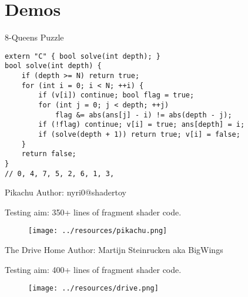 \section{Demos}

\begin{frame}[fragile]{8-Queens Puzzle}
\begin{lstlisting}
extern "C" { bool solve(int depth); }
bool solve(int depth) {
	if (depth >= N) return true;
	for (int i = 0; i < N; ++i) {
		if (v[i]) continue; bool flag = true;
		for (int j = 0; j < depth; ++j) 
            flag &= abs(ans[j] - i) != abs(depth - j); 
        if (!flag) continue; v[i] = true; ans[depth] = i;
		if (solve(depth + 1)) return true; v[i] = false;
	}
	return false;
}
// 0, 4, 7, 5, 2, 6, 1, 3,
\end{lstlisting}
\end{frame}

\begin{frame}[fragile]{Pikachu}
    Author: nyri0@shadertoy

    Testing aim: 350+ lines of fragment shader code.
    \begin{figure}
        \texttt{[image: ../resources/pikachu.png]}
    \end{figure}
\end{frame}

\begin{frame}[fragile]{The Drive Home}
    Author: Martijn Steinrucken aka BigWings

    Testing aim: 400+ lines of fragment shader code.
    \begin{figure}
        \texttt{[image: ../resources/drive.png]}
    \end{figure}
\end{frame}